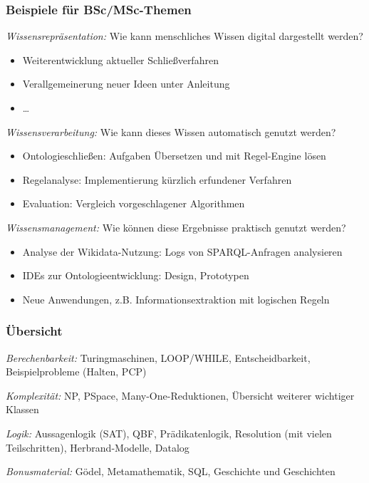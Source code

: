 \documentclass[aspectratio=1610,onlymath]{beamer}
\begin{document}
\begin{frame}\frametitle{Beispiele für BSc/MSc-Themen}

\emph{Wissensrepräsentation:} \alert{Wie kann menschliches Wissen digital dargestellt werden?}
\begin{itemize}
\item Weiterentwicklung aktueller Schließverfahren
\item Verallgemeinerung neuer Ideen unter Anleitung
\item \ldots
\end{itemize}\medskip

\emph{Wissensverarbeitung:} \alert{Wie kann dieses Wissen automatisch genutzt werden?}
\begin{itemize}
\item Ontologieschließen: Aufgaben Übersetzen und mit Regel-Engine lösen
\item Regelanalyse: Implementierung kürzlich erfundener Verfahren
\item Evaluation: Vergleich vorgeschlagener Algorithmen
\end{itemize}\medskip

\emph{Wissensmanagement:} \alert{Wie können diese Ergebnisse praktisch genutzt werden?}
\begin{itemize}
\item Analyse der Wikidata-Nutzung: Logs von SPARQL-Anfragen analysieren
\item IDEs zur Ontologieentwicklung: Design, Prototypen
\item Neue Anwendungen, z.B. Informationsextraktion mit logischen Regeln
\end{itemize}

\end{frame}



\begin{frame}\frametitle{Übersicht}


\emph{Berechenbarkeit:} Turingmaschinen, LOOP/WHILE, Entscheidbarkeit, Beispielprobleme (Halten, PCP)
\bigskip

\emph{Komplexität:} NP, PSpace, Many-One-Reduktionen, Übersicht weiterer wichtiger Klassen
\bigskip

\emph{Logik:} Aussagenlogik (SAT), QBF, Prädikatenlogik, Resolution (mit vielen Teilschritten), Herbrand-Modelle, Datalog
\bigskip

\emph{Bonusmaterial:} Gödel, Metamathematik, SQL, Geschichte und Geschichten

\end{frame}
\end{document}
